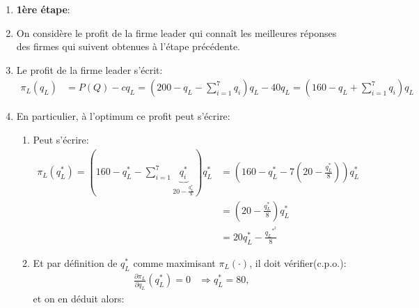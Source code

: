 \documentclass[notes, ignorenonframetext, compress, 10pt, xcolor=svgnames, aspectratio=169]{beamer}
\begin{document}
\begin{frame}[allowframebreaks]{\insertsection}
\begin{enumerate}[$\star$]
             \framebreak
             \item \textbf{1ère étape}:
             \item On considère le profit de la firme leader qui connaît les meilleures réponses des firmes 
             qui suivent obtenues à l'étape précédente.  
             \item Le profit de la firme leader s'écrit:
             \begin{align*}
                \pi_L(q_L) &= P(Q)-cq_L =  \left(200 -q_L - \sum_{i=1}^7 q_i\right)q_L - 40q_L 
                = \left(160 -q_L + \sum_{i=1}^7 q_i\right) q_L
             \end{align*}
             \item En particulier, à l'optimum ce profit peut s'écrire:
             \begin{enumerate}[$\star$]
                \item Peut s'écrire:
                \begin{align*}
                \pi_L(q_L^*) = \left(160 -q_L^* - \sum_{i=1}^7 \underbrace{q_i^*}_{20 -\frac{q_L^*}{8}}\right)q_L^* 
                &= \left(160 -q_L^* - 7\left(20 -\frac{q_L^*}{8}\right)\right)q_L^*\\
                &= \left(20-\frac{q_L^*}{8}\right)q_L^*\\
                &= 20q_L^* -\frac{q_L{^{*^2}}}{8}
               \end{align*}
               \item Et par définition de $q_L^*$ comme maximisant $\pi_L(\cdot)$, il doit vérifier(c.p.o.):  
               \begin{align*}
                \frac{\partial \pi_L}{\partial q_L}(q_L^*) = 0 &\Rightarrow q_L^* = 80,
               \end{align*}
               et on en déduit alors: 
               

\end{enumerate}
\end{enumerate}
\end{frame}
\end{document}
